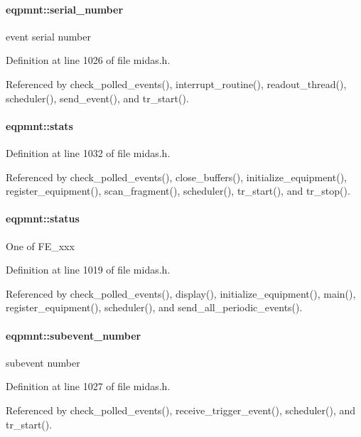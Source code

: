 \paragraph[{serial\_\-number}]{ {\bf eqpmnt::serial\_\-number}}\hfill\label{structeqpmnt_a1eeffec216604567e3ddbed40cbb0a15}
event serial number 

Definition at line 1026 of file midas.h.

Referenced by check\_\-polled\_\-events(), interrupt\_\-routine(), readout\_\-thread(), scheduler(), send\_\-event(), and tr\_\-start().
\paragraph[{stats}]{ {\bf eqpmnt::stats}}\hfill\label{structeqpmnt_a474c4fbb3bad41ba157076e3a86e93ea}


Definition at line 1032 of file midas.h.

Referenced by check\_\-polled\_\-events(), close\_\-buffers(), initialize\_\-equipment(), register\_\-equipment(), scan\_\-fragment(), scheduler(), tr\_\-start(), and tr\_\-stop().
\paragraph[{status}]{ {\bf eqpmnt::status}}\hfill\label{structeqpmnt_af498c07c0758b46649715eead4627874}
One of FE\_\-xxx 

Definition at line 1019 of file midas.h.

Referenced by check\_\-polled\_\-events(), display(), initialize\_\-equipment(), main(), register\_\-equipment(), scheduler(), and send\_\-all\_\-periodic\_\-events().
\paragraph[{subevent\_\-number}]{ {\bf eqpmnt::subevent\_\-number}}\hfill\label{structeqpmnt_a1649c4fed8b7c97441a167a860cae4af}
subevent number 

Definition at line 1027 of file midas.h.

Referenced by check\_\-polled\_\-events(), receive\_\-trigger\_\-event(), scheduler(), and tr\_\-start().